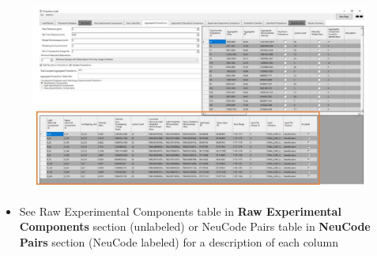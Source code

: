 \begin{itemize}
		\begin{figure}[h]
\centering
\includegraphics[scale=0.5]{figures/aggregated_proteoforms4.jpg}
\end{figure}
	\begin{itemize}
		\item See Raw Experimental Components table in \textbf{Raw Experimental Components} section (unlabeled) or NeuCode Pairs table in \textbf{NeuCode Pairs} section (NeuCode labeled) for a description of each column
	\end{itemize}
\end{itemize}